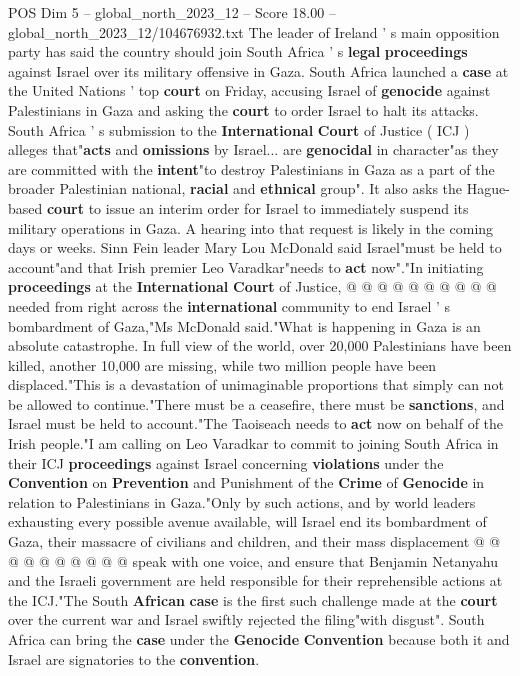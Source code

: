 \begin{textsample}{POS Dim 5 – global\_north\_2023\_12 – Score 18.00 – global\_north\_2023\_12/104676932.txt}  \label{ex:f5_pos_342}
The leader of Ireland ' s main opposition party has said the country should join South Africa ' s \textbf{legal} \textbf{proceedings} against Israel over its military offensive in Gaza.
South Africa launched a \textbf{case} at the United Nations ' top \textbf{court} on Friday, accusing Israel of \textbf{genocide} against Palestinians in Gaza and asking the \textbf{court} to order Israel to halt its attacks.
South Africa ' s submission to the \textbf{International} \textbf{Court} of Justice ( ICJ ) alleges that"\textbf{acts} and \textbf{omissions} by Israel... are \textbf{genocidal} in character"as they are committed with the \textbf{intent}"to destroy Palestinians in Gaza as a part of the broader Palestinian national, \textbf{racial} and \textbf{ethnical} group".
It also asks the Hague-based \textbf{court} to issue an interim order for Israel to immediately suspend its military operations in Gaza.
A hearing into that request is likely in the coming days or weeks.
Sinn Fein leader Mary Lou McDonald said Israel"must be held to account"and that Irish premier Leo Varadkar"needs to \textbf{act} now"."In initiating \textbf{proceedings} at the \textbf{International} \textbf{Court} of Justice, @ @ @ @ @ @ @ @ @ @ needed from right across the \textbf{international} community to end Israel ' s bombardment of Gaza,"Ms McDonald said."What is happening in Gaza is an absolute catastrophe.
In full view of the world, over 20,000 Palestinians have been killed, another 10,000 are missing, while two million people have been displaced."This is a devastation of unimaginable proportions that simply can not be allowed to continue."There must be a ceasefire, there must be \textbf{sanctions}, and Israel must be held to account."The Taoiseach needs to \textbf{act} now on behalf of the Irish people."I am calling on Leo Varadkar to commit to joining South Africa in their ICJ \textbf{proceedings} against Israel concerning \textbf{violations} under the \textbf{Convention} on \textbf{Prevention} and Punishment of the \textbf{Crime} of \textbf{Genocide} in relation to Palestinians in Gaza."Only by such actions, and by world leaders exhausting every possible avenue available, will Israel end its bombardment of Gaza, their massacre of civilians and children, and their mass displacement @ @ @ @ @ @ @ @ @ @ speak with one voice, and ensure that Benjamin Netanyahu and the Israeli government are held responsible for their reprehensible actions at the ICJ."The South \textbf{African} \textbf{case} is the first such challenge made at the \textbf{court} over the current war and Israel swiftly rejected the filing"with disgust".
South Africa can bring the \textbf{case} under the \textbf{Genocide} \textbf{Convention} because both it and Israel are signatories to the \textbf{convention}.

\end{textsample}
